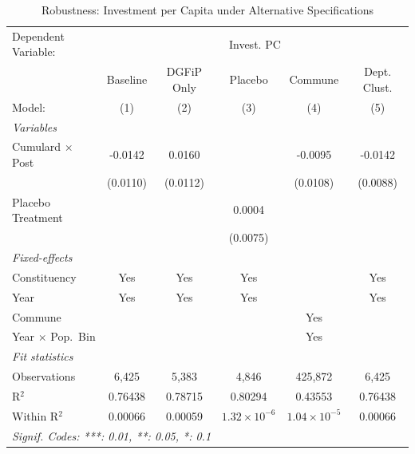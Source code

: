 
\begin{table}[htbp]
   \caption{\label{tab:robust_invest} Robustness: Investment per Capita under Alternative Specifications}
   \centering
   \begin{tabular}{lccccc}
      \tabularnewline \midrule \midrule
      Dependent Variable: & \multicolumn{5}{c}{Invest. PC}\\
                                & Baseline & DGFiP Only & Placebo               & Commune               & Dept. Clust. \\   
      Model:                    & (1)      & (2)        & (3)                   & (4)                   & (5)\\  
      \midrule
      \emph{Variables}\\
      Cumulard $\times$ Post    & -0.0142  & 0.0160     &                       & -0.0095               & -0.0142\\   
                                & (0.0110) & (0.0112)   &                       & (0.0108)              & (0.0088)\\   
      Placebo Treatment         &          &            & 0.0004                &                       &   \\   
                                &          &            & (0.0075)              &                       &   \\   
      \midrule
      \emph{Fixed-effects}\\
      Constituency              & Yes      & Yes        & Yes                   &                       & Yes\\  
      Year                      & Yes      & Yes        & Yes                   &                       & Yes\\  
      Commune                   &          &            &                       & Yes                   & \\  
      Year $\times$ Pop.\ Bin   &          &            &                       & Yes                   & \\  
      \midrule
      \emph{Fit statistics}\\
      Observations              & 6,425    & 5,383      & 4,846                 & 425,872               & 6,425\\  
      R$^2$                     & 0.76438  & 0.78715    & 0.80294               & 0.43553               & 0.76438\\  
      Within R$^2$              & 0.00066  & 0.00059    & $1.32\times 10^{-6}$  & $1.04\times 10^{-5}$  & 0.00066\\  
      \midrule \midrule
      \multicolumn{6}{l}{\emph{Signif. Codes: ***: 0.01, **: 0.05, *: 0.1}}\\
   \end{tabular}
   

\end{table}
